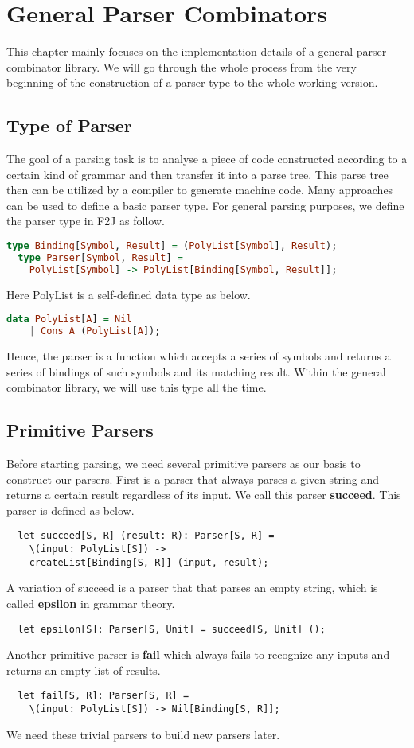 \chapter{General Parser Combinators}
This chapter mainly focuses on the implementation details of a general parser combinator library. We will go through the whole process from the very beginning of the construction of a parser type to the whole working version.

\section{Type of Parser}
The goal of a parsing task is to analyse a piece of code constructed according to a certain kind of grammar and then transfer it into a parse tree. This parse tree then can be utilized by a compiler to generate machine code. Many approaches can be used to define a basic parser type. For general parsing purposes, we define the parser type in F2J as follow.
\begin{lstlisting}[language=Haskell,basicstyle=\small]
  type Binding[Symbol, Result] = (PolyList[Symbol], Result);
  type Parser[Symbol, Result] = 
	PolyList[Symbol] -> PolyList[Binding[Symbol, Result]];
\end{lstlisting}
Here PolyList is a self-defined data type as below.
\begin{lstlisting}[language=Haskell,basicstyle=\small]
  data PolyList[A] = Nil
	| Cons A (PolyList[A]);
\end{lstlisting}
Hence, the parser is a function which accepts a series of symbols and returns a series of bindings of such symbols and its matching result. Within the general combinator library, we will use this type all the time.

\section{Primitive Parsers}
Before starting parsing, we need several primitive parsers as our basis to construct our parsers. First is a parser that always parses a given string and returns a certain result regardless of its input. We call this parser \textbf{succeed}. This parser is defined as below.
\begin{lstlisting}
  let succeed[S, R] (result: R): Parser[S, R] =
	\(input: PolyList[S]) -> 
	createList[Binding[S, R]] (input, result);
\end{lstlisting}
A variation of succeed is a parser that that parses an empty string, which is called \textbf{epsilon} in grammar theory.
\begin{lstlisting}
  let epsilon[S]: Parser[S, Unit] = succeed[S, Unit] ();
\end{lstlisting}
Another primitive parser is \textbf{fail} which always fails to recognize any inputs and returns an empty list of results.
\begin{lstlisting}
  let fail[S, R]: Parser[S, R] =
	\(input: PolyList[S]) -> Nil[Binding[S, R]];
\end{lstlisting}
We need these trivial parsers to build new parsers later.

